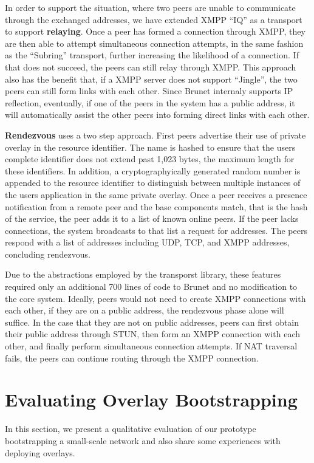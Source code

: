 \documentclass[conference]{IEEEtran}
\begin{document}
In order to support the situation, where two peers are unable to communicate
through the exchanged addresses, we have extended XMPP ``IQ'' as a transport to
support \textbf{relaying}.  Once a peer has formed a connection through XMPP,
they are then able to attempt simultaneous connection attempts, in the same
fashion as the ``Subring'' transport, further increasing the likelihood of a
connection.  If that does not succeed, the peers can still relay through XMPP.
This approach also has the benefit that, if a XMPP server does not support
``Jingle'', the two peers can still form links with each other.  Since Brunet
internaly supports IP reflection, eventually, if one of the peers in the system
has a public address, it will automatically assist the other peers into forming
direct links with each other.

\textbf{Rendezvous} uses a two step approach.  First peers advertise their use
of private overlay in the resource identifier.  The name is hashed to ensure
that the users complete identifier does not extend past 1,023 bytes, the
maximum length for these identifiers.  In addition, a cryptographyically
generated random number is appended to the resource identifier to distinguish
between multiple instances of the users application in the same private
overlay.  Once a peer receives a presence notification from a remote peer and
the base components match, that is the hash of the service, the peer adds it to
a list of known online peers.  If the peer lacks connections, the system
broadcasts to that list a request for addresses.  The peers respond with a list
of addresses including UDP, TCP, and XMPP addresses, concluding rendezvous.

Due to the abstractions employed by the transporst library, these features
required only an additional 700 lines of code to Brunet and no modification to
the core system.  Ideally, peers would not need to create XMPP connections with
each other, if they are on a public address, the rendezvous phase alone will
suffice.  In the case that they are not on public addresses, peers can first
obtain their public address through STUN, then form an XMPP connection with
each other, and finally perform simultaneous connection attempts.  If NAT
traversal fails, the peers can continue routing through the XMPP connection.

\section{Evaluating Overlay Bootstrapping}
\label{evaluations}
In this section, we present a qualitative evaluation of our prototype
bootstrapping a small-scale network and also share some experiences with
deploying overlays.
\end{document}
